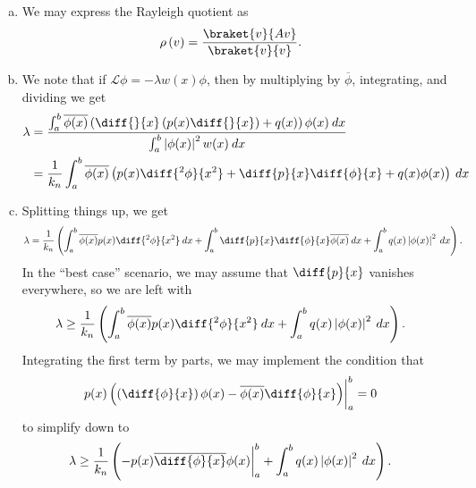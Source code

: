 \documentclass[10pt]{mypackage}
\begin{document}
\begin{solution}[40.27]\hfill
  \begin{enumerate}[(a)]
    \item We may express the Rayleigh quotient as
      \begin{align*}
        \rho\left( v \right) &= \frac{\braket{v}{Av}}{\braket{v}{v}}.
      \end{align*}
    \item We note that if $\mathcal{L}\phi = -\lambda w(x)\phi$, then by multiplying by $ \overline{\phi} $, integrating, and dividing we get
      \begin{align*}
        \lambda &= \frac{ \int_{a}^{b} \overline{\phi(x)} \left( \diff{}{x}\left( p(x)\diff{}{x} \right) + q(x) \right)\phi(x)\:dx }{ \int_{a}^{b} \left\vert \phi(x) \right\vert^2w(x)\:dx }\\
                &= \frac{1}{k_n} \int_{a}^{b} \overline{\phi(x)}\left( p(x)\diff{^2\phi}{x^2} + \diff{p}{x}\diff{\phi}{x} + q(x)\phi(x) \right)\:dx
      \end{align*}
    \item Splitting things up, we get
      \begin{align*}
        \lambda &= \frac{1}{k_n} \left( \int_{a}^{b} \overline{\phi(x)}p(x)\diff{^2\phi}{x^2}\:dx + \int_{a}^{b} \diff{p}{x}\diff{\phi}{x} \overline{\phi(x)}\:dx + \int_{a}^{b} q(x)\left\vert \phi(x) \right\vert^2\:dx \right).
      \end{align*}
      In the ``best case'' scenario, we may assume that $\diff{p}{x}$ vanishes everywhere, so we are left with
      \begin{align*}
        \lambda &\geq \frac{1}{k_n} \left( \int_{a}^{b} \overline{\phi(x)}p(x)\diff{^2\phi}{x^2}\:dx + \int_{a}^{b} q(x)\left\vert \phi(x) \right\vert^2\:dx \right).
      \end{align*}
      Integrating the first term by parts, we may implement the condition that
      \begin{align*}
        p(x)\left( \left( \diff{\phi}{x} \right)\phi(x) - \overline{\phi(x)}\diff{\phi}{x} \right)\biggr\vert_{a}^{b} &= 0
      \end{align*}
      to simplify down to
      \begin{align*}
        \lambda &\geq \frac{1}{k_n}\left( -p(x) \overline{\diff{\phi}{x}} \phi(x)\biggr\vert_{a}^{b} + \int_{a}^{b} q(x) \left\vert \phi(x) \right\vert^2\:dx \right).
      \end{align*}
  \end{enumerate}
\end{solution}
\end{document}
